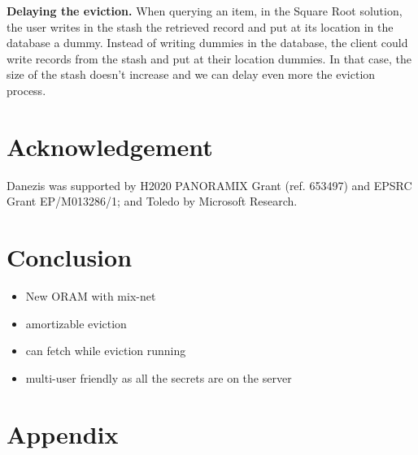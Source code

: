 \documentclass{llncs}
\begin{document}
\noindent\textbf{Delaying the eviction.} When querying an item, in the Square Root solution, the user writes in the stash the retrieved record and put at its location in the database a dummy. Instead of writing dummies in the database, the client could write records from the stash and put at their location dummies. In that case, the size of the stash doesn't increase and we can delay even more the eviction process.


\section{Acknowledgement}
Danezis was supported by H2020  PANORAMIX Grant (ref. 653497) and EPSRC Grant EP/M013286/1; and Toledo by Microsoft Research.


\section{Conclusion}\label{Conclusion}
\begin{itemize}
 \item New ORAM with mix-net
 \item amortizable eviction
 \item can fetch while eviction running
 \item multi-user friendly as all the secrets are on the server
\end{itemize}




\section{Appendix}
\end{document}
